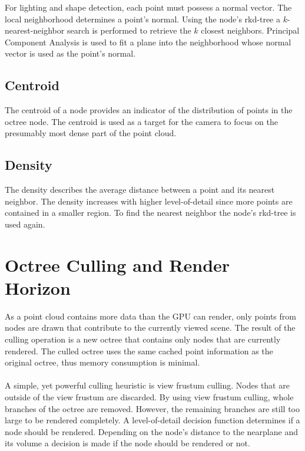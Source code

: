 For lighting and shape detection, each point must possess a normal vector. The local neighborhood determines a point's normal. Using the node's rkd-tree a $k$-nearest-neighbor search is performed to retrieve the $k$ closest neighbors. Principal Component Analysis \cite{jolliffe2002principal} is used to fit a plane into the neighborhood whose normal vector is used as the point's normal.


\subsection{Centroid}

The centroid of a node provides an indicator of the distribution of points in the octree node. The centroid is used as a target for the camera to focus on the presumably most dense part of the point cloud. 


\subsection{Density}

The density describes the average distance between a point and its nearest neighbor. The density increases with higher level-of-detail since more points are contained in a smaller region. To find the nearest neighbor the node's rkd-tree is used again.


\section{Octree Culling and Render Horizon}
\label{sec:renderHorizon}

As a point cloud contains more data than the GPU can render, only points from nodes are drawn that contribute to the currently viewed scene. The result of the culling operation is a new octree that contains only nodes that are currently rendered. The culled octree uses the same cached point information as the original octree, thus memory consumption is minimal. 
\\
\\
A simple, yet powerful culling heuristic is view frustum culling. Nodes that are outside of the view frustum are discarded. By using view frustum culling, whole branches of the octree are removed. However, the remaining branches are still too large to be rendered completely. A level-of-detail decision function determines if a node should be rendered. Depending on the node's distance to the nearplane and its volume a decision is made if the node should be rendered or not. 

